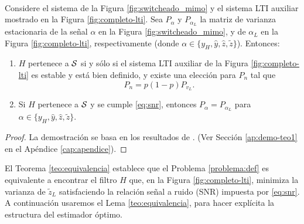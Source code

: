 \begin{lema}\label{teo:equivalencia}{\ \\}
Considere el sistema de la Figura \ref{fig:switcheado_mimo} y el sistema LTI auxiliar mostrado en la Figura \ref{fig:completo-lti}. Sea $P_{\alpha}$ y $P_{\alpha_L}$ la matriz de varianza estacionaria de la se\~nal $\alpha$ en la Figura \ref{fig:switcheado_mimo}, y de $\alpha_L$ en la Figura \ref{fig:completo-lti}, respectivamente (donde $\alpha \in \{ y_H,\hat{y},\hat{z},\tilde{z}\}$). Entonces:
\begin{enumerate}
\item $H$ pertenece a $\cal{S}$ si y s\'olo si el sistema LTI auxiliar de la Figura \ref{fig:completo-lti} es estable y est\'a bien definido, y existe una elecci\'on para $P_n$ tal que
\begin{equation}\label{eq:snr}
P_n=p(1-p)P_{v_L}.
\end{equation}
\item Si $H$ pertenece a $\cal{S}$ y se cumple \eqref{eq:snr}, entonces $P_{\alpha}=P_{\alpha_L}$ para $\alpha \in \{ y_H,\hat{y},\hat{z},\tilde{z}\}$.
\end{enumerate}
\end{lema}
\begin{proof}
La demostraci\'on se basa en los resultados de \cite{sebatesis}. (Ver Secci\'on \ref{ap:demo-teo1} en el Ap\'endice \ref{cap:apendice}).\QED
\end{proof}

El Teorema \ref{teo:equivalencia} establece que el Problema \ref{problema:def} es equivalente a encontrar el filtro $H$ que, en la Figura \ref{fig:completo-lti}, minimiza la varianza de $\tilde{z}_L$ satisfaciendo la relaci\'on se\~nal a ruido (SNR) impuesta por \eqref{eq:snr}. A continuaci\'on usaremos el Lema \ref{teo:equivalencia}, para hacer expl\'icita la estructura del estimador \'optimo.

